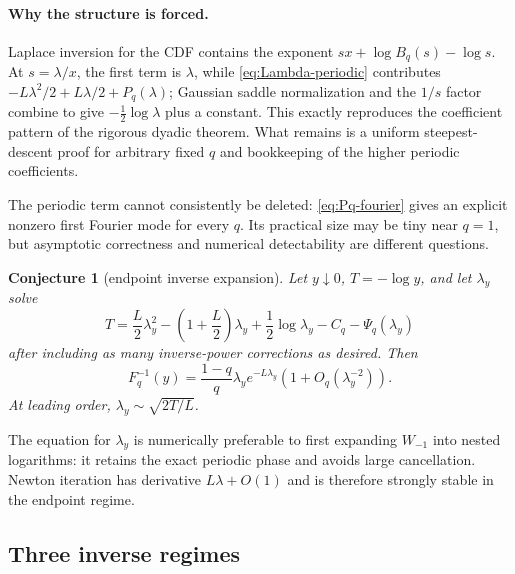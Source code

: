 \documentclass[11pt,oneside]{article}
\newtheorem{conjecture}[theorem]{Conjecture}
\theoremstyle{definition}
\theoremstyle{remark}
\begin{document}
\paragraph{Why the structure is forced.}
Laplace inversion for the CDF contains the exponent
$sx+\log B_q(s)-\log s$.  At $s=\lambda/x$, the first term is $\lambda$, while \cref{eq:Lambda-periodic} contributes
$-L\lambda^2/2+L\lambda/2+P_q(\lambda)$; Gaussian saddle normalization and the $1/s$ factor combine to give $-\tfrac12\log\lambda$ plus a constant.  This exactly reproduces the coefficient pattern of the rigorous dyadic theorem.  What remains is a uniform steepest-descent proof for arbitrary fixed $q$ and bookkeeping of the higher periodic coefficients.

The periodic term cannot consistently be deleted: \cref{eq:Pq-fourier} gives an explicit nonzero first Fourier mode for every $q$.  Its practical size may be tiny near $q=1$, but asymptotic correctness and numerical detectability are different questions.

\begin{conjecture}[endpoint inverse expansion]\label{conj:endpoint-inverse}
Let $y\downarrow0$, $T=-\log y$, and let $\lambda_y$ solve
\begin{equation}\label{eq:inverse-lambda-equation}
 T=\frac L2\lambda_y^2-
 \left(1+\frac L2\right)\lambda_y
 +\frac12\log\lambda_y-C_q-\Psi_q(\lambda_y)
\end{equation}
after including as many inverse-power corrections as desired.  Then
\begin{equation}\label{eq:endpoint-inverse}
 F_q^{-1}(y)=\frac{1-q}{q}\lambda_y e^{-L\lambda_y}
 \left(1+O_q(\lambda_y^{-2})\right).
\end{equation}
At leading order, $\lambda_y\sim\sqrt{2T/L}$.
\end{conjecture}

The equation for $\lambda_y$ is numerically preferable to first expanding $W_{-1}$ into nested logarithms: it retains the exact periodic phase and avoids large cancellation.  Newton iteration has derivative $L\lambda+O(1)$ and is therefore strongly stable in the endpoint regime.

\subsection{Three inverse regimes}
\end{document}
